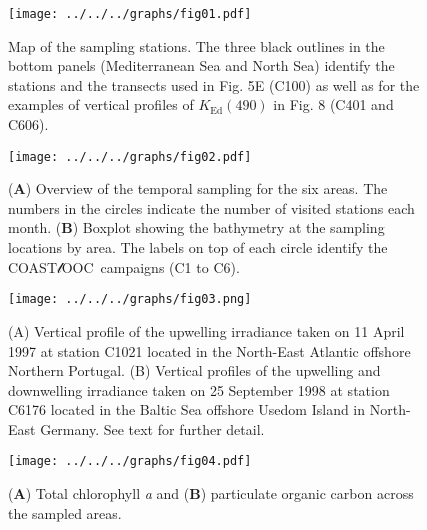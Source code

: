 \documentclass[essd, manuscript]{copernicus}
\newcommand{\coastlooc}{COAST$\mathscr{l}$OOC~\allowbreak}
\begin{document}




\begin{figure}[t]
    \texttt{[image: ../../../graphs/fig01.pdf]}
    \caption{Map of the sampling stations. The three black outlines in the bottom panels (Mediterranean Sea and North Sea) identify the stations and the transects used in Fig. 5E (C100) as well as for the examples of vertical profiles of $K_{\text{Ed}}(490)$ in Fig. 8 (C401 and C606).}
\end{figure}

\clearpage

\begin{figure}[t]
    \texttt{[image: ../../../graphs/fig02.pdf]}
    \caption{(\textbf{A}) Overview of the temporal sampling for the six areas. The numbers in the circles indicate the number of visited stations each month. (\textbf{B}) Boxplot showing the bathymetry at the sampling locations by area. The labels on top of each circle identify the \coastlooc campaigns (C1 to C6).}
\end{figure}

\clearpage

\begin{figure}[t]
    \texttt{[image: ../../../graphs/fig03.png]}
    \caption{(A) Vertical profile of the upwelling irradiance taken on 11 April 1997 at station C1021 located in the North-East Atlantic offshore Northern Portugal. (B) Vertical profiles of the upwelling and downwelling irradiance taken on 25 September 1998 at station C6176 located in the Baltic Sea offshore Usedom Island in North-East Germany. See text for further detail.}
\end{figure}

\clearpage

\begin{figure}[t]
    \texttt{[image: ../../../graphs/fig04.pdf]}
    \caption{(\textbf{A}) Total chlorophyll \textit{a} and (\textbf{B}) particulate organic carbon across the sampled areas.}
\end{figure}
\end{document}
